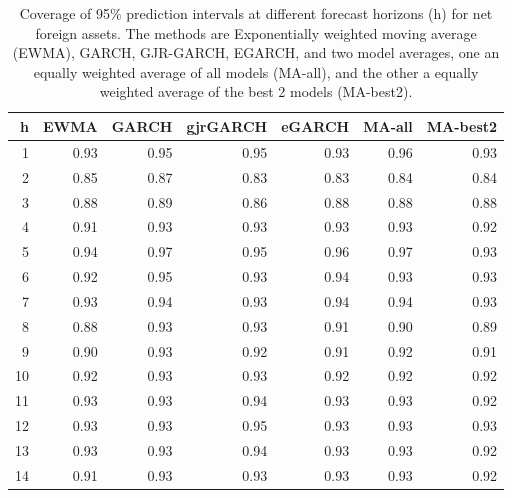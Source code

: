 \documentclass{article}
\begin{document}
\begin{table}[ht]
\centering
\begin{tabular}{rrrrrrr}
  \hline
h & EWMA & GARCH & gjrGARCH & eGARCH & MA-all & MA-best2 \\ 
  \hline
1 & 0.93 & 0.95 & 0.95 & 0.93 & 0.96 & 0.93 \\ 
  2 & 0.85 & 0.87 & 0.83 & 0.83 & 0.84 & 0.84 \\ 
  3 & 0.88 & 0.89 & 0.86 & 0.88 & 0.88 & 0.88 \\ 
  4 & 0.91 & 0.93 & 0.93 & 0.93 & 0.93 & 0.92 \\ 
  5 & 0.94 & 0.97 & 0.95 & 0.96 & 0.97 & 0.93 \\ 
  6 & 0.92 & 0.95 & 0.93 & 0.94 & 0.93 & 0.93 \\ 
  7 & 0.93 & 0.94 & 0.93 & 0.94 & 0.94 & 0.93 \\ 
  8 & 0.88 & 0.93 & 0.93 & 0.91 & 0.90 & 0.89 \\ 
  9 & 0.90 & 0.93 & 0.92 & 0.91 & 0.92 & 0.91 \\ 
  10 & 0.92 & 0.93 & 0.93 & 0.92 & 0.92 & 0.92 \\ 
  11 & 0.93 & 0.93 & 0.94 & 0.93 & 0.93 & 0.92 \\ 
  12 & 0.93 & 0.93 & 0.95 & 0.93 & 0.93 & 0.93 \\ 
  13 & 0.93 & 0.93 & 0.94 & 0.93 & 0.93 & 0.92 \\ 
  14 & 0.91 & 0.93 & 0.93 & 0.93 & 0.93 & 0.92 \\ 
   \hline
\end{tabular}
\caption{Coverage of 95\% prediction intervals at different forecast horizons (h) for net foreign assets. The methods are Exponentially weighted moving average (EWMA), GARCH, GJR-GARCH, EGARCH, and two model averages, one an equally weighted average of all models (MA-all), and the other a equally weighted average of the best 2 models (MA-best2).} 
\label{tab:covnfa}
\end{table}
\end{document}
